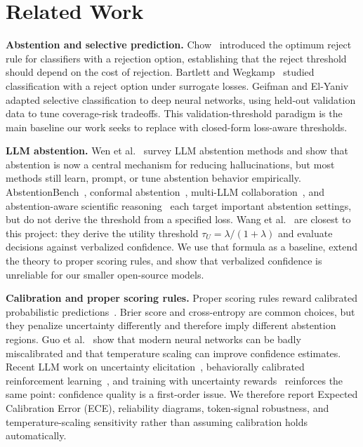 \documentclass[letterpaper,10pt,twocolumn]{article}
\begin{document}
\section{Related Work}

\textbf{Abstention and selective prediction.}
Chow~\cite{chow1970} introduced the optimum reject rule for classifiers with
a rejection option, establishing that the reject threshold should depend on
the cost of rejection. Bartlett and Wegkamp~\cite{bartlett2008} studied
classification with a reject option under surrogate losses. Geifman and
El-Yaniv~\cite{geifman2017} adapted selective classification to deep neural
networks, using held-out validation data to tune coverage-risk tradeoffs.
This validation-threshold paradigm is the main baseline our work seeks to
replace with closed-form loss-aware thresholds.

\textbf{LLM abstention.}
Wen et al.~\cite{wen2025} survey LLM abstention methods and show that
abstention is now a central mechanism for reducing hallucinations, but most
methods still learn, prompt, or tune abstention behavior empirically.
AbstentionBench~\cite{kirichenko2025}, conformal abstention~\cite{yadkori2024},
multi-LLM collaboration~\cite{feng2024}, and abstention-aware scientific
reasoning~\cite{abdaljalil2026} each target important abstention settings,
but do not derive the threshold from a specified loss. Wang et
al.~\cite{wang2026} are closest to this project: they derive the utility
threshold $\tau_U=\lambda/(1+\lambda)$ and evaluate decisions against
verbalized confidence. We use that formula as a baseline, extend the theory
to proper scoring rules, and show that verbalized confidence is unreliable
for our smaller open-source models.

\textbf{Calibration and proper scoring rules.}
Proper scoring rules reward calibrated probabilistic predictions~\cite{gneiting2007}.
Brier score and cross-entropy are common choices, but they penalize
uncertainty differently and therefore imply different abstention regions.
Guo et al.~\cite{guo2017} show that modern neural networks can be badly
miscalibrated and that temperature scaling can improve confidence estimates.
Recent LLM work on uncertainty elicitation~\cite{xiong2024}, behaviorally
calibrated reinforcement learning~\cite{wu2026}, and training with uncertainty
rewards~\cite{damani2025} reinforces the same point: confidence quality is a
first-order issue. We therefore report Expected Calibration Error (ECE),
reliability diagrams, token-signal robustness, and temperature-scaling
sensitivity rather than assuming calibration holds automatically.
\end{document}

